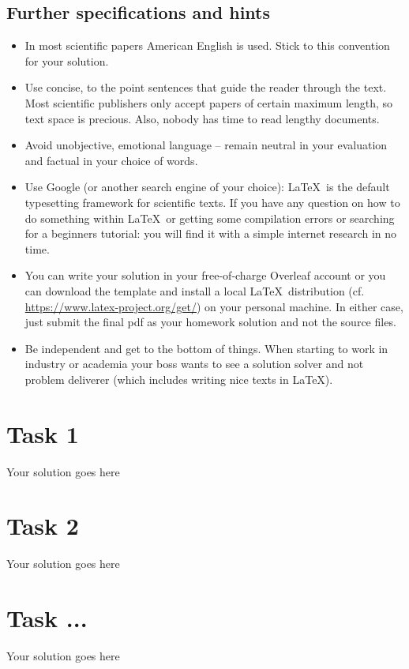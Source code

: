 \documentclass[journal]{IEEEtran}
\begin{document}
\subsection{Further specifications and hints}
\begin{itemize}
    \item In most scientific papers American English is used. Stick to this convention for your solution.
    \item Use concise, to the point sentences that guide the reader through the text. Most scientific publishers only accept papers of certain maximum length, so text space is precious. Also, nobody has time to read lengthy documents.  
    \item Avoid unobjective, emotional language -- remain neutral in your evaluation and factual in your choice of words.
    \item Use Google (or another search engine of your choice): \LaTeX\ is the default typesetting framework for scientific texts. If you have any question on how to do something within \LaTeX\ or getting some compilation errors or searching for a beginners tutorial: you will find it with a simple internet research in no time. 
    \item You can write your solution in your free-of-charge Overleaf account or you can download the template and install a local \LaTeX\ distribution (cf. \url{https://www.latex-project.org/get/}) on your personal machine. In either case, just submit the final pdf as your homework solution and not the source files.
    \item Be independent and get to the bottom of things. When starting to work in industry or academia your boss wants to see a solution solver and not problem deliverer (which includes writing nice texts in \LaTeX). 
\end{itemize}


\section{Task 1}
Your solution goes here
\section{Task 2}
Your solution goes here
\section{Task ...}
Your solution goes here
\end{document}
